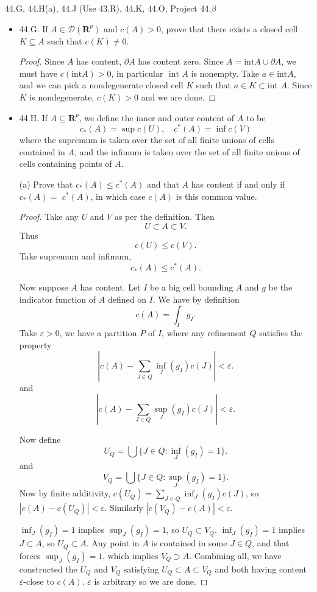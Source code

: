 44.G, 44.H(a), 44.J (Use 43.R), 44.K, 44.O, Project 44.$\beta$
\begin{itemize}
	\item 44.G. If $A \in \mathscr{D}\left(\boldsymbol{R}^p\right)$ and $c(A)>0$, prove that there exists a closed cell $K \subseteq A$ such that $c(K) \neq 0$.
\begin{proof}
	Since $A$ has content, $\partial A$ has content zero. Since $A = \text{int} A \cup \partial A$, we must have $c\left( \text{int} A \right)  > 0$, in particular  $\text{ int } A $ is nonempty. Take $a \in \text{int} A$, and we can pick a nondegenerate closed cell $K$ such that $a \in K \subset \text{int }A$. Since $ K$ is nondegenerate, $c(K) > 0$ and we are done.
\end{proof}

	\item 44.H. If $A \subseteq \boldsymbol{R}^p$, we define the inner and outer content of $A$ to be
\[
c_*(A)=\sup c(U), \quad c^*(A)=\inf c(V)
\]
where the supremum is taken over the set of all finite unions of cells contained in $A$, and the infimum is taken over the set of all finite unions of cells containing points of $A$.

(a) Prove that $c_*(A) \leq c^*(A)$ and that $A$ has content if and only if $c_*(A)=$ $c^*(A)$, in which case $c(A)$ is this common value.
\begin{proof}
	Take any $U$ and $V$ as per the definition. Then
	\[
		U \subset A \subset V
	.\] 
	Thus
	\[
		c(U) \le c(V)
	.\] 
	Take supremum and infimum,
	\[
		c_*(A) \le  c^*(A)
	.\] 

	Now suppose $A$ has content. Let $I$ be a big cell bounding $A$ and $g$ be the indicator function of $A$ defined on $I$. We have by definition
	\[
		c(A) = \int _I g_I
	.\] 
	Take $\varepsilon>0$, we have a partition $P$ of $I$, where any refinement $Q$ satisfies the property
	\[
		\left|c(A) -  \sum_{J \in Q} \inf _J (g_I) c(J) \right| <\varepsilon
	.\] 
	and
	\[
		\left|c(A) -  \sum_{J \in Q} \sup _J (g_I) c(J) \right| <\varepsilon
	.\] 

	Now define
	\[
		U_Q = \bigcup \{J \in Q: \inf _J (g_I) = 1\}  
	.\] 
	and
	\[
		V_Q = \bigcup \{J \in Q: \sup _J (g_I) = 1 \} 
	.\] 
	Now
	by finite additivity, $c(U_Q) = \sum_{J \in Q} \inf _J (g_I) c(J)$, so $|c\left(A \right)  - c(U_Q)| < \varepsilon$. Similarly $|c(V_Q) - c(A)| < \varepsilon$. 

	$\inf  _J(g_I) = 1$ implies $\sup _J (g_I) = 1$, so $U_Q \subset V_Q$. $\inf _J (g_I) = 1$ implies $J \subset A$, so  $U_Q \subset A$. Any point in $A$ is contained in some $J \in Q$, and that forces $\sup _J (g_I) = 1$, which implies $V_Q \supset A$. Combining all, we have constructed the $U_Q$ and $V_Q$ satisfying $U_Q \subset A \subset V_Q$ and both having content  $\varepsilon$-close to $c(A)$. $\varepsilon$ is arbitrary so we are done.


\end{proof}
\end{itemize}
